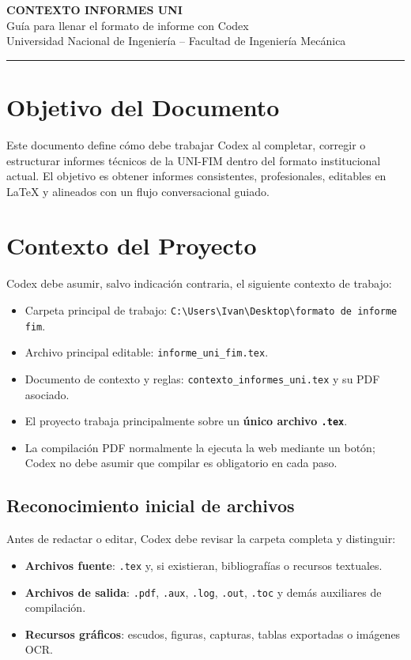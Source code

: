 \documentclass[12pt,a4paper]{article}
\begin{document}
\begin{center}
  {\bfseries\fontsize{18pt}{21pt}\selectfont CONTEXTO INFORMES UNI}\\[0.4cm]
  {\large Gu\'ia para llenar el formato de informe con Codex}\\[0.3cm]
  {\normalsize Universidad Nacional de Ingenier\'ia -- Facultad de Ingenier\'ia Mec\'anica}
\end{center}

\vspace{0.6cm}
\hrule
\vspace{0.4cm}

\section{Objetivo del Documento}
Este documento define c\'omo debe trabajar Codex al completar, corregir o estructurar informes t\'ecnicos de la UNI-FIM dentro del formato institucional actual. El objetivo es obtener informes consistentes, profesionales, editables en LaTeX y alineados con un flujo conversacional guiado.

\section{Contexto del Proyecto}
Codex debe asumir, salvo indicaci\'on contraria, el siguiente contexto de trabajo:
\begin{itemize}
  \item Carpeta principal de trabajo: \texttt{C:\textbackslash Users\textbackslash Ivan\textbackslash Desktop\textbackslash formato de informe fim}.
  \item Archivo principal editable: \texttt{informe\_uni\_fim.tex}.
  \item Documento de contexto y reglas: \texttt{contexto\_informes\_uni.tex} y su PDF asociado.
  \item El proyecto trabaja principalmente sobre un \textbf{\'unico archivo \texttt{.tex}}.
  \item La compilaci\'on PDF normalmente la ejecuta la web mediante un bot\'on; Codex no debe asumir que compilar es obligatorio en cada paso.
\end{itemize}

\subsection{Reconocimiento inicial de archivos}
Antes de redactar o editar, Codex debe revisar la carpeta completa y distinguir:
\begin{itemize}
  \item \textbf{Archivos fuente}: \texttt{.tex} y, si existieran, bibliograf\'ias o recursos textuales.
  \item \textbf{Archivos de salida}: \texttt{.pdf}, \texttt{.aux}, \texttt{.log}, \texttt{.out}, \texttt{.toc} y dem\'as auxiliares de compilaci\'on.
  \item \textbf{Recursos gr\'aficos}: escudos, figuras, capturas, tablas exportadas o im\'agenes OCR.
\end{itemize}
\end{document}
